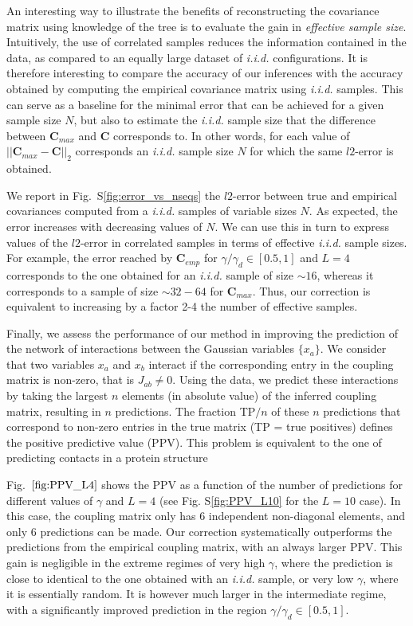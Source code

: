 \documentclass[preprint,amsmath,amssymb,superscriptaddress,showpacs,pre]{revtex4-1}
\newcommand{\sref}[1]{S\ref{#1}}
\begin{document}
An interesting way to illustrate the benefits of reconstructing the covariance matrix using knowledge of the tree is to evaluate the gain in {\em effective sample size}. 
Intuitively, the use of correlated samples reduces the information contained in the data, as compared to an equally large dataset of \emph{i.i.d.} configurations. 
It is therefore interesting to compare the accuracy of our inferences with the accuracy obtained by computing the empirical covariance matrix using \emph{i.i.d.} samples. 
This can serve as a baseline for the minimal error that can be achieved for a given sample size $N$, but also to estimate the \emph{i.i.d.} sample size that the difference between $\bm{C}_{max}$ and $\bm{C}$ corresponds to. 
In other words, for each value of $\vert\vert \bm{C}_{max} - \bm{C}\vert\vert_2$ corresponds an \emph{i.i.d.} sample size $N$ for which the same $l2$-error is obtained. 

We report in Fig.~\sref{fig:error_vs_nseqs} the $l2$-error between true and empirical covariances computed from a \emph{i.i.d.} samples of variable sizes $N$. 
As expected, the error increases with decreasing values of $N$. 
We can use this in turn to express values of the $l2$-error in correlated samples in terms of effective \emph{i.i.d.} sample sizes.   
For example, the error reached by $\bm{C}_{emp}$ for $\gamma/\gamma_d\in[0.5, 1]$ and $L=4$ corresponds to the one obtained for an \emph{i.i.d.} sample of size $\sim 16$, whereas it corresponds to a sample of size $\sim 32-64$ for $\bm{C}_{max}$.
Thus, our correction is equivalent to increasing by a factor 2-4 the number of effective samples.

Finally, we assess the performance of our method in improving the prediction of the network of interactions between the Gaussian variables $\{x_a\}$. 
We consider that two variables $x_a$ and $x_b$ interact if the corresponding entry in the coupling matrix is non-zero, that is $J_{ab}\neq 0$. 
Using the data, we predict these interactions by taking the largest $n$ elements (in absolute value) of the inferred coupling matrix, resulting in $n$ predictions. 
The fraction TP$/n$ of these $n$ predictions that correspond to non-zero entries in the true matrix (TP = true positives) defines the positive predictive value (PPV). 
This problem is equivalent to the one of predicting contacts in a protein structure 

Fig.~$\ref{fig:PPV_L4}$ shows the PPV as a function of the number of predictions for different values of $\gamma$ and $L=4$ (see Fig. \sref{fig:PPV_L10} for the $L=10$ case). 
In this case, the coupling matrix only has $6$ independent non-diagonal elements, and only 6 predictions can be made. 
Our correction systematically outperforms the predictions from the empirical coupling matrix, with an always larger PPV. 
This gain is negligible in the extreme regimes of very high $\gamma$, where the prediction is close to identical to the one obtained with an \emph{i.i.d.} sample, or very low $\gamma$, where it is essentially random. 
It is however much larger in the intermediate regime, with a significantly improved prediction in the region $\gamma/\gamma_d\in[0.5,1]$.
\end{document}
